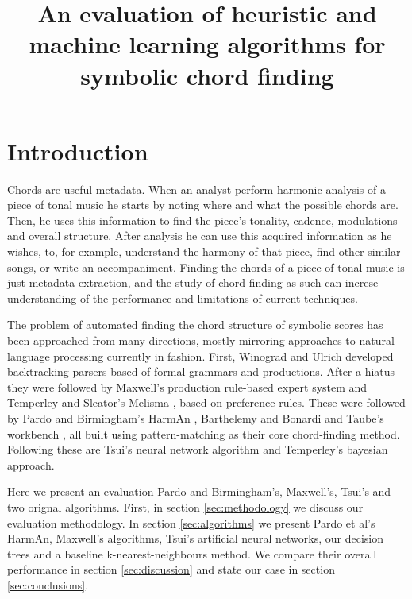 \documentclass{article}
\title{An evaluation of heuristic and machine learning algorithms for
  symbolic chord finding} \oneauthor {}{}
\newcommand{\comment}[1]{}
\begin{document}
\graphicspath{{figs/}{data/}}
\maketitle

\begin{abstract}
\end{abstract}

\section{Introduction}
\label{sec:introduction}

\comment{
  ==> chord finding é importante, vários algoritmos propostos, poucas
  comparações 
  ==> revisar algoritmos
  ==> descrever artigo
}

Chords are useful metadata. When an analyst perform harmonic analysis
of a piece of tonal music he starts by noting where and what the
possible chords are. Then, he uses this information to find the
piece's tonality, cadence, modulations and overall structure. After
analysis he can use this acquired information as he wishes, to, for
example, understand the harmony of that piece, find other similar
songs, or write an accompaniment. Finding the chords of a piece of
tonal music is just metadata extraction, and the study of chord
finding as such can increse understanding of the performance and
limitations of current techniques.

The problem of automated finding the chord structure of symbolic
scores has been approached from many directions, mostly mirroring
approaches to natural language processing currently in fashion.
First, Winograd \cite{winograd:linguistics} and Ulrich
\cite{ulrich:analysis} developed backtracking parsers based of formal
grammars and productions. After a hiatus they were followed by
Maxwell's \cite{maxwell:expert} production rule-based expert system
and Temperley and Sleator's Melisma \cite{temperley.ea:modeling},
based on preference rules. These were followed by Pardo and
Birmingham's HarmAn \cite{pardo.ea:automated}, Barthelemy and Bonardi
\cite{barthelemy.ea:figured} and Taube's workbench
\cite{taube:automatic}, all built using pattern-matching as their core
chord-finding method. Following these are Tsui's \cite{tsui:harmonic}
neural network algorithm and Temperley's \cite{temperley:bayesian}
bayesian approach.

Here we present an evaluation Pardo and Birmingham's, Maxwell's,
Tsui's and two orignal algorithms. First, in section
\ref{sec:methodology} we discuss our evaluation methodology. In
section \ref{sec:algorithms} we present Pardo et al's HarmAn,
Maxwell's algorithms, Tsui's artificial neural networks, our decision
trees and a baseline k-nearest-neighbours method. We compare their
overall performance in section \ref{sec:discussion} and state our case
in section \ref{sec:conclusions}.
\end{document}
